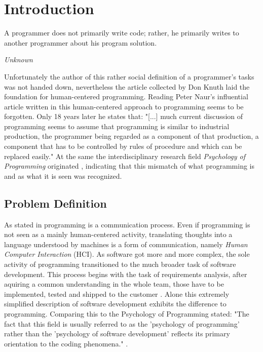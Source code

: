 \chapter{Introduction}
\epigraph{A programmer does not primarily write code; rather, he primarily writes to another programmer about his program solution.}{\textit{Unknown}}
Unfortunately the author of this rather social definition of a programmer's tasks was not handed down, nevertheless the article \textcite{noauthor_what_1967} collected by Don Knuth laid the foundation for human-centered programming.
Reading Peter Naur's influential article  written in \citeyear{naur_programming_1985} this human-centered approach to programming seems to be forgotten. Only 18 years later he states that: "[...] much current discussion of programming seems to assume that programming is similar to industrial production, the programmer being regarded as a component of that production, a component that has to be controlled by rules of procedure and which can be replaced easily."
At the same the interdisciplinary research field \emph{Psychology of Programming} originated \autocite{myers_past_2009}, indicating that this mismatch of what programming is and as what it is seen was recognized.


\section{Problem Definition}
\label{sec:problem-definition}
As stated in \textcite{noauthor_what_1967} programming is a communication process.
Even if programming is not seen as a mainly human-centered activity, translating thoughts into a language understood by machines is a form of communication, namely \emph{Human Computer Interaction} (HCI).
As software got more and more complex, the sole activity of programming transitioned to the much broader task of software development.
This process begins with the task of requirements analysis, after aquiring a common understanding in the whole team, those have to be implemented, tested and shipped to the customer \autocite{mayr_projekt_2005}.
Alone this extremely simplified description of software development exhibits the difference to programming.
Comparing this to the Psychology of Programming \citeauthor{curtis_psychology_1990} stated: "The fact that this field is usually referred to as the 'psychology of programming' rather than the 'psychology of software development' reflects its primary orientation to the coding phenomena." \autocite[267]{curtis_psychology_1990}.

